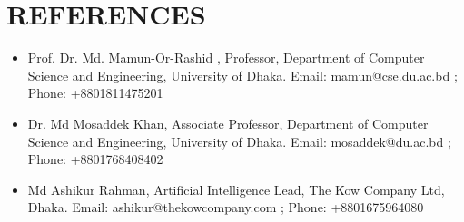 \documentclass[letterpaper,11pt]{article}
\begin{document}
\section{REFERENCES}
\begin{itemize}[leftmargin=0.15in]
    \small
    \item Prof. Dr. Md. Mamun-Or-Rashid , Professor, Department of Computer Science and Engineering, University of Dhaka. Email: mamun@cse.du.ac.bd ; Phone: +8801811475201
    \item Dr. Md Mosaddek Khan, Associate Professor, Department of Computer Science and Engineering, University of Dhaka. Email: mosaddek@du.ac.bd ; Phone: +8801768408402
    \item Md Ashikur Rahman, Artificial Intelligence Lead, The Kow Company Ltd, Dhaka. Email: ashikur@thekowcompany.com ; Phone: +8801675964080 
\end{itemize}
\end{document}
